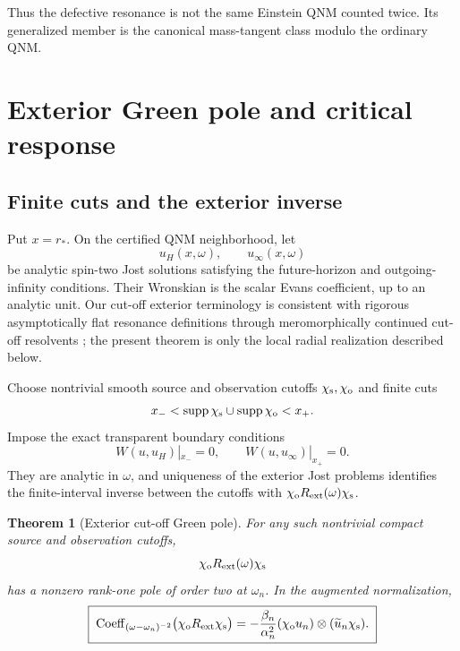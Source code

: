 \documentclass[11pt]{article}
\newtheorem{theorem}{Theorem}[section]
\theoremstyle{remark}
\begin{document}
Thus the defective resonance is not the same Einstein QNM counted twice.
Its generalized member is the canonical mass-tangent class modulo the
ordinary QNM.

\section{Exterior Green pole and critical response}
\label{sec:green}

\subsection{Finite cuts and the exterior inverse}

Put \(x=r_*\).  On the certified QNM neighborhood, let
\[
 u_H(x,\omega),\qquad u_\infty(x,\omega)
\]
be analytic spin-two Jost solutions satisfying the future-horizon and
outgoing-infinity conditions.  Their Wronskian is the scalar Evans
coefficient, up to an analytic unit.
Our cut-off exterior terminology is consistent with rigorous
asymptotically flat resonance definitions through meromorphically continued
cut-off resolvents \cite{stucker2024,gajicwarnick2024}; the present theorem
is only the local radial realization described below.

Choose nontrivial smooth source and observation cutoffs
\(\chi_{\rm s},\chi_{\rm o}\) and finite cuts
\[
 x_-<
 \operatorname{supp}\chi_{\rm s}\cup
 \operatorname{supp}\chi_{\rm o}
 <x_+.
\]
Impose the exact transparent boundary conditions
\[
 W(u,u_H)|_{x_-}=0,\qquad
 W(u,u_\infty)|_{x_+}=0.
\]
They are analytic in \(\omega\), and uniqueness of the exterior Jost
problems identifies the finite-interval inverse between the cutoffs with
\(\chi_{\rm o}R_{\rm ext}(\omega)\chi_{\rm s}\).

\begin{theorem}[Exterior cut-off Green pole]
\label{thm:exterior-green-pole}
For any such nontrivial compact source and observation cutoffs,
\[
 \chi_{\rm o}R_{\rm ext}(\omega)\chi_{\rm s}
\]
has a nonzero rank-one pole of order two at \(\omega_n\).  In the
augmented normalization,
\begin{equation}\label{eq:green-principal}
 \boxed{\;
 \operatorname{Coeff}_{(\omega-\omega_n)^{-2}}
 \bigl(\chi_{\rm o}R_{\rm ext}\chi_{\rm s}\bigr)
 =
 -\frac{\beta_n}{\alpha_n^2}
 (\chi_{\rm o}u_n)\otimes
 (\widetilde u_n\chi_{\rm s}).
 \;}
\end{equation}
\end{theorem}
\end{document}
